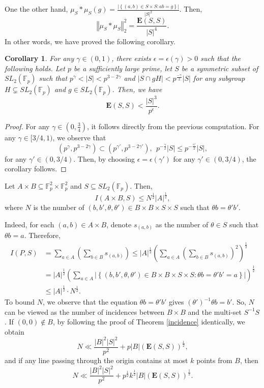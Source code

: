 \documentclass[11pt]{article}
\newtheorem{corollary}[theorem]{Corollary}
\def\Fbb{\mathbb{F}}
\def\Ebf{\textbf{E}}
\def\SL{SL}
\def\l({\left(}
\def\r){\right)}
\def\lv{\left\vert}
\def\rv{\right\vert}
\def\lo{\left\{}
\def\ro{\right\}}
\def\lV{\left\Vert}
\def\rV{\right\Vert}
\begin{document}
One the other hand, $\mu_S \ast \mu_S (g) = \frac{\lv  \lo (a,b)\in S \times S \colon ab=g \ro \rv}{\lv S\rv^2} $. Then,
\[ \lV \mu_S \ast \mu_S \rV_2^2 = \frac{\Ebf \l( S,S \r)}{\lv S\rv^4}.\]
In other words, we have proved the following corollary. 
\begin{corollary}\label{co:36}
For any $\gamma\in (0, 1)$, there exists $\epsilon=\epsilon(\gamma)>0$ such that the following holds.
 Let $p$ be a sufficiently large prime, let $S$ be a symmetric subset of $\SL_2 (\Fbb_p )$ such that $p^\gamma < |S| < p^{3-2\gamma } $ and $ |S \cap gH| < p^{\frac{-\gamma}{2}}|S|$ for any subgroup $H \subsetneq \SL_2 (\Fbb_p) $ and $g\in \SL_2(\Fbb_p)$. Then, we  have
\begin{equation}
\Ebf \l( S,S \r) < \frac{\lv S\rv^3}{p^{\epsilon}}.
\end{equation}    
\end{corollary}
\begin{proof}
    For any $\gamma\in (0, \frac{3}{4})$, it follows directly from the previous computation. For any $\gamma\in [3/4, 1)$, we observe that 
    \[(p^\gamma, p^{3-2\gamma})\subset (p^{\gamma'}, p^{3-2\gamma'}), ~~p^{-\frac{\gamma}{2}}|S|\le p^{-\frac{\gamma'}{2}}|S|,\]
    for any $\gamma'\in (0, 3/4)$. Then, by choosing $\epsilon=\epsilon(\gamma')$ for any $\gamma'\in (0, 3/4)$, the corollary follows.
\end{proof}


 Let $A \times B \subseteq \Fbb_p^2 \times \Fbb_p^2 $ and $S\subseteq \SL_2 \l( \Fbb_p \r)$. Then,
    \[ I(A\times B,S) \le N^{\frac{1}{2}}\lv A\rv^{\frac{1}{2}} ,\]
    where $N$ is the number of $\l( b,b',\theta ,\theta' \r) \in B \times B \times S \times S$ such that $\theta b  =\theta 'b'$.

Indeed,  for each $\l( a,b \r) \in A\times B$, denote $s_{(a,b)} $ as the number of $\theta \in S$ such that $\theta b=a$. Therefore,
    \begin{align*}
        I(P,S) & = \sum_{a\in A} \l( \sum_{b\in B} s_{(a,b)} \r)  \le  \lv A\rv^{\frac{1}{2}} \l( \sum_{a\in A} \l( \sum_{b\in B} s_{(a,b)} \r)^2 \r)^{\frac{1}{2}} \\
        & =  \lv A\rv^\frac{1}{2} \l( \sum_{a\in A} \lv \lo \l( b,b',\theta ,\theta' \r) \in B\times B \times S \times S \colon \theta b=\theta 'b' =a \ro \rv \r)^{\frac{1}{2}} \\
        & \le \lv A\rv^{\frac{1}{2}} \cdot N^{\frac{1}{2}}.
    \end{align*}
To bound $N$, we observe that the equation $\theta b=\theta'b'$ gives $(\theta')^{-1}\theta b=b'$. So, $N$ can be viewed as the number of incidences between $B\times B$ and the multi-set $S^{-1}S$.  If $(0, 0) \notin B$, by following the proof of Theorem \ref{incidence} identically, we obtain
\[N\ll  \frac{\lv B\rv^2 \lv S\rv^2}{p^2} +p\lv B\rv (\Ebf (S,S))^{\frac{1}{2}},\]
and if any line passing through the origin contains at most $k$ points from $B$, then
\[ N \ll  \frac{\lv B\rv^2 \lv S\rv^2}{p^2} +p^{\frac{1}{2}}k^{\frac{1}{2}}\lv B\rv (\Ebf (S,S))^{\frac{1}{2}}.\]
\end{document}
